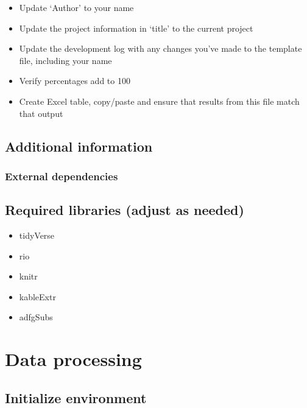 \documentclass[
]{article}
\providecommand{\tightlist}{%
  \setlength{\itemsep}{0pt}\setlength{\parskip}{0pt}}
\begin{document}
\begin{itemize}
\tightlist
\item
  Update `Author' to your name\\
\item
  Update the project information in `title' to the current project\\
\item
  Update the development log with any changes you've made to the
  template file, including your name\\
\item
  Verify percentages add to 100\\
\item
  Create Excel table, copy/paste and ensure that results from this file
  match that output
\end{itemize}

\subsection{Additional information}\label{additional-information}

\subsubsection{External dependencies}\label{external-dependencies}

\subsection{Required libraries (adjust as
needed)}\label{required-libraries-adjust-as-needed}

\begin{itemize}
\tightlist
\item
  tidyVerse\\
\item
  rio
\item
  knitr\\
\item
  kableExtr
\item
  adfgSubs
\end{itemize}

\section{Data processing}\label{data-processing}

\subsection{Initialize environment}\label{initialize-environment}
\end{document}

